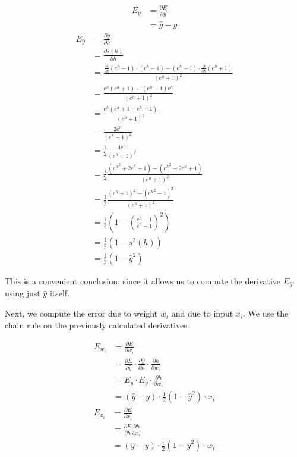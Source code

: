 \documentclass[12pt]{article}
\newcommand{\yhat}{{\hat y}}
\renewcommand{\d}{\partial}
\renewcommand{\dh}{{\partial h}}
\newcommand{\Half}{{\frac 1 2}}
\begin{document}
\begin{align}
E_y &= \frac{\d E}{\d \yhat} \\
    &= \yhat - y
\end{align}
\begin{align}
E_\yhat &= \frac{\d \yhat}{\dh} \\
    &= \frac{\d s(h)}{\dh} \\
    &= \frac{\frac \d \dh {(e^h - 1)} \cdot (e^h + 1) -
       (e^h - 1) \cdot \frac \d \dh {(e^h + 1)}}{(e^h + 1)^2} \\
    &= \frac{e^h (e^h + 1) - (e^h - 1) e^h}{(e^h + 1)^2} \\
    &= \frac{e^h (e^h + 1 - e^h + 1)}{(e^h + 1)^2} \\
    &= \frac{2 e^h}{(e^h + 1)^2} \\
    &= \Half \frac{4 e^h}{(e^h + 1)^2} \\
    &= \Half \frac{\left ({e^h}^2 + 2e^h + 1 \right ) -
                   \left ( {e^h}^2 - 2e^h + 1 \right )}{(e^h + 1)^2} \\
    &= \Half \frac{({e^h} + 1)^2 -
                   ({e^h}^2 - 1)^2}{(e^h + 1)^2} \\
    &= \Half \left ( 1 - \left ( \frac{e^h - 1}{e^h +1} \right )^2\right ) \\
    &= \Half \left ( 1 - s^2(h) \right ) \\
    &= \Half \left ( 1 - \yhat^2  \right )
\end{align}

This is a convenient conclusion, since it allows us to
compute the derivative $E_\yhat$ using just $\yhat$ itself.

Next, we compute the error due to weight $w_i$ and
due to input $x_i$. We use the chain rule on the previously
calculated derivatives.

\begin{align}
E_{w_i} &= \frac{\d E}{\d w_i} \\
    &= \frac{\d E}{\d \yhat} \cdot
       \frac{\d \yhat}{\dh} \cdot
       \frac{\d h}{\d {w_i}} \\
    &= E_y \cdot E_\yhat \cdot \frac{\dh}{\d {w_i}} \\
    &= (\yhat - y) \cdot \Half (1 - \yhat^2) \cdot
       x_i  \label{eqn-Ewi}
\end{align}
\begin{align}
E_{x_i} &= \frac{\d E}{\d x_i} \\
    &= \frac{\d E}{\d h} \frac{\d h}{\d x_i} \\
    &= (\yhat - y) \cdot \Half (1 - \yhat^2) \cdot w_i \label{eqn-Exi}
\end{align}
\end{document}
